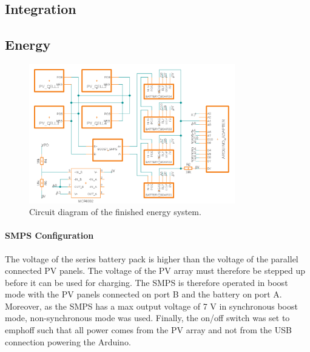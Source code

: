 \documentclass[a4paper]{article}
\begin{document}
\subsection{Integration}

\subsection{Energy}
\vspace{-10pt}
\begin{figure}[H]
    \centering
    \includegraphics[width=0.8\textwidth]{Circuit_Diagram.png}
    \caption{Circuit diagram of the finished energy system.}
    \label{fig:circuitDiagram}
\end{figure}

\paragraph*{SMPS Configuration}
The voltage of the series battery pack is higher than the voltage of 
the parallel connected PV panels. The voltage of the PV array must 
therefore be stepped up before it can be used for charging. The SMPS 
is therefore operated in boost mode with the PV panels connected on 
port B and the battery on port A. Moreover, as the SMPS has a max 
output voltage of 7 V in synchronous boost mode\cite{powerLogbook}, 
non-synchronous mode was used. Finally, the on/off switch was set 
to emph{off} such that all power comes from the PV array and not 
from the USB connection powering the Arduino.
\end{document}
